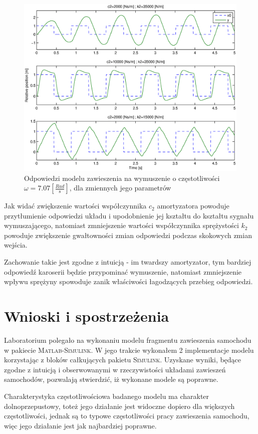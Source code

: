 \documentclass[12pt]{article}
\begin{document}
\begin{figure}[!htb]
	\begin{center}
		\includegraphics[width=\linewidth]{../res/img/responces_par.eps}
	\end{center}
	\caption{Odpowiedzi modelu zawieszenia na wymuszenie o częstotliwości
	$\omega=7.07[\frac{Rad}{\textrm{s}}]$, dla zmiennych jego parametrów}
\end{figure}

Jak widać zwiększenie wartości współczynnika $c_2$ amortyzatora powoduje
przytłumienie odpowiedzi układu i upodobnienie jej kształtu do kształtu sygnału
wymuszającego, natomiast zmniejszenie wartości współczynnika sprężystości $k_2$
powoduje zwiększenie gwałtowności zmian odpowiedzi podczas skokowych zmian wejścia.

Zachowanie takie jest zgodne z intuicją - im twardszy amortyzator, tym bardziej
odpowiedź karoserii będzie przypominać wymuszenie, natomiast zmniejszenie wpływu
sprężyny spowoduje zanik właściwości łagodzących przebieg odpowiedzi.

\newpage

\section{Wnioski i spostrzeżenia}

Laboratorium polegało na wykonaniu modelu fragmentu zawieszenia samochodu w
pakiecie \textsc{Matlab-Simulink}. W jego trakcie wykonałem 2 implementacje
modelu korzystając z bloków całkujących pakietu \textsc{Simulink}. Uzyskane
wyniki, będące zgodne z intuicją i obserwowanymi w rzeczywistości układami
zawieszeń samochodów, pozwalają stwierdzić, iż wykonane modele są poprawne.

Charakterystyka częstotliwościowa badanego modelu ma charakter dolnoprzepustowy,
toteż jego działanie jest widoczne dopiero dla większych częstotliwości, jednak
są to typowe częstotliwości pracy zawieszenia samochodu, więc jego działanie
jest jak najbardziej poprawne.
\end{document}
